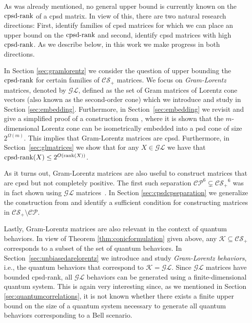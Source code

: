 \documentclass{siamart}
\begin{document}
{{{As  was already mentioned, no general  upper bound  is currently known on the ${\mathrm{cpsd}\textnormal{-rank}}$ of a {cpsd matrix}.
In view of this,  there are two natural research directions: First, identify families of cpsd matrices for which we can place an upper   bound on the ${\mathrm{cpsd}\textnormal{-rank}}$ and {second}, identify cpsd matrices with high ${\mathrm{cpsd}\textnormal{-rank}}$.
 As we describe below, in this work we make   progress in both directions.

In Section \ref{sec:gramlorentz} we consider the  question of upper bounding the ${\mathrm{cpsd}\textnormal{-rank}}$ for certain  families of ${\mathcal{CS}_+}$ matrices. {We focus on}
 {\em Gram-Lorentz} matrices,  denoted by ${\mathcal{GL}}$, defined as the set of Gram matrices of Lorentz cone vectors (also known as {the} second-order cone)  which we introduce and study in Section \ref{sec:embedding}. Furthermore, in Section~\ref{sec:embedding} we revisit  and give a simplified proof of  a construction from \cite{FW}, where it {is} shown that the $m$-dimensional  Lorentz cone can be isometrically embedded into a psd cone of size $2^{\Omega(m)}$. This  implies  that   Gram-Lorentz  matrices  are cpsd. Furthermore,  in Section~\ref{sec:glmatrices}   we show that for any $X\in {\mathcal{GL}}$ we have that ${\mathrm{cpsd}\textnormal{-rank}}(X)\le 2^{O({\mathrm{rank}}(X))}$.

As it turns out, Gram-Lorentz matrices are also useful  to construct  matrices   that are cpsd but not completely positive. The first such  separation ${\mathcal{CP}}^6 {\subsetneq} {\mathcal{CS}_+}^6$ was  in fact shown   using ${\mathcal{GL}}$ matrices~\cite{FW}.   In Section \ref{sec:cpsdcpseparation} we generalize the construction from \cite{FW} and identify a sufficient condition for constructing matrices in ${\mathcal{CS}_+}\setminus {\mathcal{CP}}$.

Lastly, Gram-Lorentz matrices are also relevant in the context of
quantum behaviors.  In view of Theorem \ref{thm:conicformulation}
given above,  any      ${\mathcal{K}}\subseteq {\mathcal{CS}_+}$ corresponds to a
subset of the set of quantum behaviors. In Section~\ref{sec:unbiasedarelorentz} we
introduce and study {\em Gram-Lorentz  behaviors}, i.e., the quantum
behaviors that correspond to  ${\mathcal{K}}={\mathcal{GL}}$. Since ${\mathcal{GL}}$ matrices have
bounded cpsd-rank, all ${\mathcal{GL}}$ behaviors can be generated using  a
{finite-dimensional} quantum system. This  is again very interesting
since, as we mentioned in Section \ref{sec:quantumcorrelations}, it
is not known whether there exists a finite  upper  bound on the size
of a quantum system necessary  to generate  all quantum behaviors
corresponding to a  Bell scenario.

}}}
\end{document}
